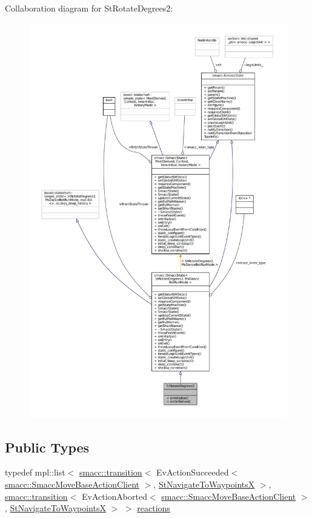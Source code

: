 Collaboration diagram for St\+Rotate\+Degrees2\+:
\nopagebreak
\begin{figure}[H]
\begin{center}
\leavevmode
\includegraphics[width=350pt]{structStRotateDegrees2__coll__graph}
\end{center}
\end{figure}
\subsection*{Public Types}
\begin{DoxyCompactItemize}
\item 
typedef mpl\+::list$<$ \hyperlink{classsmacc_1_1transition}{smacc\+::transition}$<$ Ev\+Action\+Succeeded$<$ \hyperlink{classsmacc_1_1SmaccMoveBaseActionClient}{smacc\+::\+Smacc\+Move\+Base\+Action\+Client} $>$, \hyperlink{structStNavigateToWaypointsX}{St\+Navigate\+To\+WaypointsX} $>$, \hyperlink{classsmacc_1_1transition}{smacc\+::transition}$<$ Ev\+Action\+Aborted$<$ \hyperlink{classsmacc_1_1SmaccMoveBaseActionClient}{smacc\+::\+Smacc\+Move\+Base\+Action\+Client} $>$, \hyperlink{structStNavigateToWaypointsX}{St\+Navigate\+To\+WaypointsX} $>$ $>$ \hyperlink{structStRotateDegrees2_a2c5670a9c31f858e292a2e44043d6a1f}{reactions}
\end{DoxyCompactItemize}
